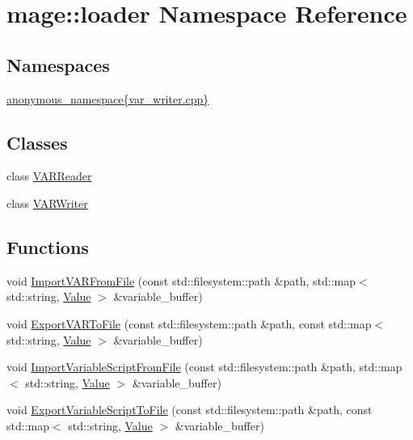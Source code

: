 \hypertarget{namespacemage_1_1loader}{}\section{mage\+:\+:loader Namespace Reference}
\label{namespacemage_1_1loader}
\subsection*{Namespaces}
\begin{DoxyCompactItemize}
\item 
 \mbox{\hyperlink{namespacemage_1_1loader_1_1anonymous__namespace_02var__writer_8cpp_03}{anonymous\+\_\+namespace\{var\+\_\+writer.\+cpp\}}}
\end{DoxyCompactItemize}
\subsection*{Classes}
\begin{DoxyCompactItemize}
\item 
class \mbox{\hyperlink{classmage_1_1loader_1_1_v_a_r_reader}{V\+A\+R\+Reader}}
\item 
class \mbox{\hyperlink{classmage_1_1loader_1_1_v_a_r_writer}{V\+A\+R\+Writer}}
\end{DoxyCompactItemize}
\subsection*{Functions}
\begin{DoxyCompactItemize}
\item 
void \mbox{\hyperlink{namespacemage_1_1loader_a761f6907eb7daf04d1461811616db1f3}{Import\+V\+A\+R\+From\+File}} (const std\+::filesystem\+::path \&path, std\+::map$<$ std\+::string, \mbox{\hyperlink{namespacemage_a68ae02d3a746ed2f285aa2b10f131a21}{Value}} $>$ \&variable\+\_\+buffer)
\item 
void \mbox{\hyperlink{namespacemage_1_1loader_a8373cd8901715a2331fcd8f8a71df554}{Export\+V\+A\+R\+To\+File}} (const std\+::filesystem\+::path \&path, const std\+::map$<$ std\+::string, \mbox{\hyperlink{namespacemage_a68ae02d3a746ed2f285aa2b10f131a21}{Value}} $>$ \&variable\+\_\+buffer)
\item 
void \mbox{\hyperlink{namespacemage_1_1loader_aa25cf60b0951e7ac3f71415e1df5ac4c}{Import\+Variable\+Script\+From\+File}} (const std\+::filesystem\+::path \&path, std\+::map$<$ std\+::string, \mbox{\hyperlink{namespacemage_a68ae02d3a746ed2f285aa2b10f131a21}{Value}} $>$ \&variable\+\_\+buffer)
\item 
void \mbox{\hyperlink{namespacemage_1_1loader_a7a50ce12e6a17de1f5db8d59ced5bc0f}{Export\+Variable\+Script\+To\+File}} (const std\+::filesystem\+::path \&path, const std\+::map$<$ std\+::string, \mbox{\hyperlink{namespacemage_a68ae02d3a746ed2f285aa2b10f131a21}{Value}} $>$ \&variable\+\_\+buffer)
\end{DoxyCompactItemize}
